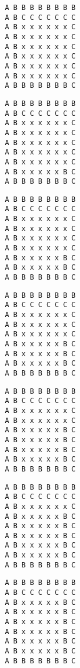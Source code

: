 { \begin{verbatim}
         A B B B B B B B B
         A B C C C C C C C
         A B x x x x x x C
         A B x x x x x x C
         A B x x x x x x C
         A B x x x x x x C
         A B x x x x x x C
         A B x x x x x x C
         A B B B B B B B C
\end{verbatim} }

{ \begin{verbatim}
         A B B B B B B B B
         A B C C C C C C C
         A B x x x x x x C
         A B x x x x x x C
         A B x x x x x x C
         A B x x x x x x C
         A B x x x x x x C
         A B x x x x x B C
         A B B B B B B B C
\end{verbatim} }

{ \begin{verbatim}
         A B B B B B B B B
         A B C C C C C C C
         A B x x x x x x C
         A B x x x x x x C
         A B x x x x x x C
         A B x x x x x x C
         A B x x x x x B C
         A B x x x x x B C
         A B B B B B B B C
\end{verbatim} }

{ \begin{verbatim}
         A B B B B B B B B
         A B C C C C C C C
         A B x x x x x x C
         A B x x x x x x C
         A B x x x x x x C
         A B x x x x x B C
         A B x x x x x B C
         A B x x x x x B C
         A B B B B B B B C
\end{verbatim} }

{ \begin{verbatim}
         A B B B B B B B B
         A B C C C C C C C
         A B x x x x x x C
         A B x x x x x x C
         A B x x x x x B C
         A B x x x x x B C
         A B x x x x x B C
         A B x x x x x B C
         A B B B B B B B C
\end{verbatim} }

{ \begin{verbatim}
         A B B B B B B B B
         A B C C C C C C C
         A B x x x x x x C
         A B x x x x x B C
         A B x x x x x B C
         A B x x x x x B C
         A B x x x x x B C
         A B x x x x x B C
         A B B B B B B B C
\end{verbatim} }

{ \begin{verbatim}
         A B B B B B B B B
         A B C C C C C C C
         A B x x x x x B C
         A B x x x x x B C
         A B x x x x x B C
         A B x x x x x B C
         A B x x x x x B C
         A B x x x x x B C
         A B B B B B B B C
\end{verbatim} }

